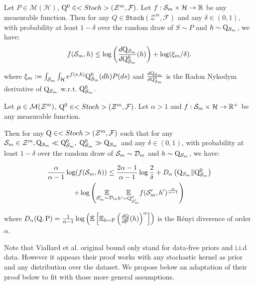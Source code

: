 \begin{proposition}
\label{prop: rivasplata_disintegrated}
 Let $P \in \mathcal{M}(\mathcal{H})$, $\mathrm{Q}^{0} \in <Stoch>(\mathcal{Z}^m,\mathcal{F})$. Let $f: \mathcal{S}_m \times \mathcal{H} \rightarrow \mathbb{R}$ be any measurable function.
Then for any $Q \in \texttt{Stoch}(\mathcal{Z}^m,\mathcal{F})$ and any $\delta \in(0,1)$, with probability at least $1-\delta$ over the random draw of $S \sim P$ and $h\sim \mathrm{Q}_{\mathcal{S}_m}$, we have:
$$
f(\mathcal{S}_m,h) \leq \log\left(\frac{d\mathrm{Q}_{\mathcal{S}_m}}{d\mathrm{Q}_{\mathcal{S}_m}^{0}}(h) \right)+\log (\xi_m / \delta) .
$$

where $\xi_m:=\int_{\mathcal{S}_m} \int_{\mathcal{H}} e^{f(s, h)} \mathrm{Q}_{\mathcal{S}_m}^{0}(d h) P(d s)$ and $\frac{d\mathrm{Q}_{\mathcal{S}_m}}{d\mathrm{Q}_{\mathcal{S}_m}^{0}}$ is the Radon Nykodym derivative of $\mathrm{Q}_{\mathcal{S}_m}$ w.r.t. $\mathrm{Q}_{\mathcal{S}_m}^0$.
\end{proposition}


\begin{proposition}
  \label{prop: viallard_disintegrated}
   Let $\mu \in \mathcal{M}(\mathcal{Z}^m)$, $\mathrm{Q}^{0} \in <Stoch>(\mathcal{Z}^m,\mathcal{F})$. Let  $\alpha>1$ and  $f: \mathcal{S}_m \times \mathcal{H} \rightarrow \mathbb{R}^+$ be any measurable function.

   Then for any $\mathrm{Q} \in <Stoch>(\mathcal{Z}^m,\mathcal{F})$ such that for any $\mathcal{S}_m\in\mathcal{Z}^m, \mathrm{Q}_{\mathcal{S}_m}\ll\mathrm{Q}_{\mathcal{S}_m}^0,\; \mathrm{Q}_{\mathcal{S}_m}^0\gg\mathrm{Q}_{\mathcal{S}_m} $ and any $\delta \in(0,1)$, with probability at least $1-\delta$ over the random draw of $\mathcal{S}_m \sim \mathcal{D}_{m}$ and $h\sim \mathrm{Q}_{\mathcal{S}_m}$, we have:

  \begin{multline*}
    \frac{\alpha}{\alpha-1} \log (f(\mathcal{S}_m,h)) \leq \frac{2 \alpha-1}{\alpha-1} \log \frac{2}{\delta}+D_{\alpha}\left(\mathrm{Q}_{\mathcal{S}_m} \| \mathrm{Q}_{\mathcal{S}_m}^0\right)\\
    +
   \log \left(\underset{\mathcal{S}_m^{\prime} \sim \mathcal{D}_{m}}{\mathbb{E}} \underset{h^{\prime} \sim \mathrm{Q}_{\mathcal{S}_m'}^0}{\mathbb{E}}
   f(\mathcal{S}_m',h')^{\frac{\alpha}{\alpha-1}}\right) 
  \end{multline*}

   where $D_\alpha(\mathrm{Q},\mathrm{P})= \frac{1}{\alpha-1}\log\left( \mathbb{E}\left[ \mathbb{E}_{h\sim \mathrm{P}} \left(\frac{d\mathrm{Q}}{d\mathrm{P}}(h)\right)^\alpha   \right] \right)$ is the Rényi diverence of order $\alpha$.

\end{proposition}

Note that Viallard et al. original bound only stand for data-free priors and i.i.d data. However it appears their proof works with any stochastic kernel as prior and any distribution over the dataset. We propose below an adaptation of their proof below to fit with those more general assumptions.


